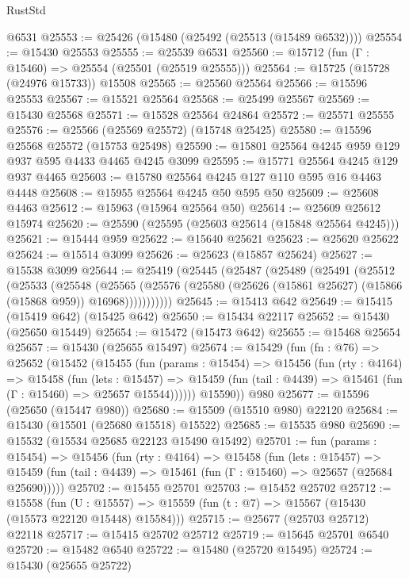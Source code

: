 \begin{lexlean}{RustStd}
\begin{coremodule}
    @6531
@25553 := @25426 (@15480 (@25492 (@25513 (@15489 @6532))))
@25554 := @15430 @25553
@25555 := @25539 @6531
@25560 := @15712 (fun (Γ : @15460) => @25554 (@25501 (@25519 @25555)))
@25564 := @15725 (@15728 (@24976 @15733)) @15508
@25565 := @25560 @25564
@25566 := @15596 @25553
@25567 := @15521 @25564
@25568 := @25499 @25567
@25569 := @15430 @25568
@25571 := @15528 @25564 @24864
@25572 := @25571 @25555
@25576 := @25566 (@25569 @25572) (@15748 @25425)
@25580 := @15596 @25568 @25572 (@15753 @25498)
@25590 := @15801 @25564 @4245 @959 @129 @937 @595 @4433 @4465 @4245 @3099
@25595 := @15771 @25564 @4245 @129 @937 @4465
@25603 := @15780 @25564 @4245 @127 @110 @595 @16 @4463 @4448
@25608 := @15955 @25564 @4245 @50 @595 @50
@25609 := @25608 @4463
@25612 := @15963 (@15964 @25564 @50)
@25614 := @25609 @25612 @15974
@25620 := @25590 (@25595 (@25603 @25614 (@15848 @25564 @4245)))
@25621 := @15444 @959
@25622 := @15640 @25621
@25623 := @25620 @25622
@25624 := @15514 @3099
@25626 := @25623 (@15857 @25624)
@25627 := @15538 @3099
@25644 := @25419
    (@25445
      (@25487
        (@25489
          (@25491
            (@25512
              (@25533
                (@25548
                  (@25565
                    (@25576 (@25580 (@25626 (@15861 @25627) (@15866 (@15868 @959)) @16968)))))))))))
@25645 := @15413 @642
@25649 := @15415 (@15419 @642) (@15425 @642)
@25650 := @15434 @22117
@25652 := @15430 (@25650 @15449)
@25654 := @15472 (@15473 @642)
@25655 := @15468 @25654
@25657 := @15430 (@25655 @15497)
@25674 := @15429
    (fun (fn : @76) =>
    @25652
      (@15452
        (@15455
          (fun (params : @15454) =>
          @15456
            (fun (rty : @4164) =>
            @15458
              (fun (lets : @15457) =>
              @15459 (fun (tail : @4439) => @15461 (fun (Γ : @15460) => @25657 @15544))))))
        @15590))
    @980
@25677 := @15596 (@25650 (@15447 @980))
@25680 := @15509 (@15510 @980) @22120
@25684 := @15430 (@15501 (@25680 @15518) @15522)
@25685 := @15535 @980
@25690 := @15532 (@15534 @25685 @22123 @15490 @15492)
@25701 := fun (params : @15454) =>
  @15456
    (fun (rty : @4164) =>
    @15458
      (fun (lets : @15457) =>
      @15459 (fun (tail : @4439) => @15461 (fun (Γ : @15460) => @25657 (@25684 @25690)))))
@25702 := @15455 @25701
@25703 := @15452 @25702
@25712 := @15558
    (fun (U : @15557) => @15559 (fun (t : @7) => @15567 (@15430 (@15573 @22120 @15448) @15584)))
@25715 := @25677 (@25703 @25712) @22118
@25717 := @15415 @25702 @25712
@25719 := @15645 @25701 @6540
@25720 := @15482 @6540
@25722 := @15480 (@25720 @15495)
@25724 := @15430 (@25655 @25722)

\end{coremodule}
\end{lexlean}
